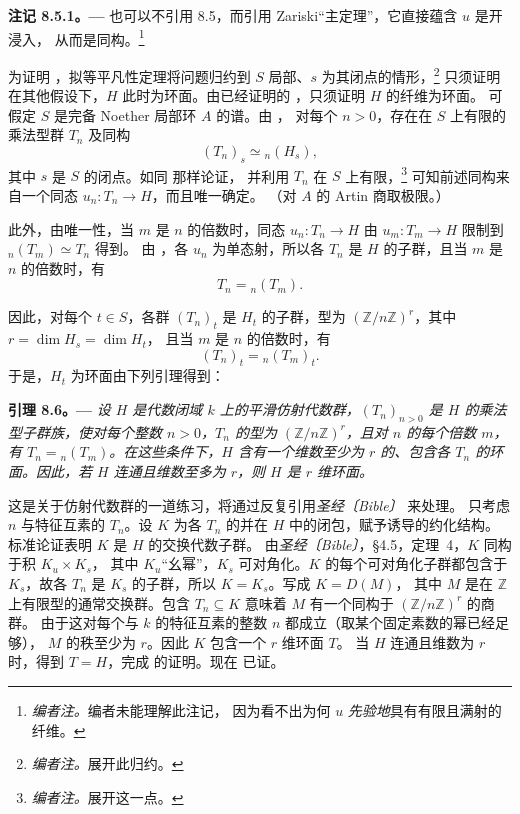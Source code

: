 \par\medskip\noindent{}\textbf{注记 8.5.1。---}\enspace
也可以不引用 8.5，而引用 Zariski“主定理”，它直接蕴含 \(u\) 是开浸入，
从而是同构。\footnote{\textit{编者注。}编者未能理解此注记，
因为看不出为何 \(u\) \emph{先验地}具有有限且满射的纤维。}

为证明 ，拟等平凡性定理将问题归约到
\(S\) 局部、\(s\) 为其闭点的情形，\footnote{\textit{编者注。}展开此归约。}
只须证明在其他假设下，\(H\) 此时为环面。由已经证明的
，只须证明 \(H\) 的纤维为环面。
可假定 \(S\) 是完备 Noether 局部环 \(A\) 的谱。由 ，
对每个 \(n>0\)，存在在 \(S\) 上有限的乘法型群 \(T_n\) 及同构
\[
  (T_n)_s\simeq {}_n(H_s),
\]
其中 \(s\) 是 \(S\) 的闭点。如同  那样论证，
并利用 \(T_n\) 在 \(S\) 上有限，\footnote{\textit{编者注。}展开这一点。}
可知前述同构来自一个同态 \(u_n:T_n\to H\)，而且唯一确定。
（对 \(A\) 的 Artin 商取极限。）

此外，由唯一性，当 \(m\) 是 \(n\) 的倍数时，同态 \(u_n:T_n\to H\)
由 \(u_m:T_m\to H\) 限制到 \({}_n(T_m)\simeq T_n\) 得到。
由 ，各 \(u_n\) 为单态射，所以各 \(T_n\)
是 \(H\) 的子群，且当 \(m\) 是 \(n\) 的倍数时，有
\[
  T_n={}_n(T_m).
\]

因此，对每个 \(t\in S\)，各群 \((T_n)_t\) 是 \(H_t\) 的子群，型为
\((\mathbb{Z}/n\mathbb{Z})^r\)，其中 \(r=\dim H_s=\dim H_t\)，
且当 \(m\) 是 \(n\) 的倍数时，有
\[
  (T_n)_t={}_n(T_m)_t.
\]
于是，\(H_t\) 为环面由下列引理得到：

\par\medskip\noindent{}\textbf{引理 8.6。---}\enspace
\emph{设 \(H\) 是代数闭域 \(k\) 上的平滑仿射代数群，\((T_n)_{n>0}\)
是 \(H\) 的乘法型子群族，使对每个整数 \(n>0\)，\(T_n\) 的型为
\((\mathbb{Z}/n\mathbb{Z})^r\)，且对 \(n\) 的每个倍数 \(m\)，有
\(T_n={}_n(T_m)\)。在这些条件下，\(H\) 含有一个维数至少为 \(r\) 的、包含各 \(T_n\)
的环面。因此，若 \(H\) 连通且维数至多为 \(r\)，则 \(H\) 是 \(r\) 维环面。}

这是关于仿射代数群的一道练习，将通过反复引用\emph{圣经〔Bible〕} 来处理。
只考虑 \(n\) 与特征互素的 \(T_n\)。设 \(K\) 为各 \(T_n\) 的并在 \(H\)
中的闭包，赋予诱导的约化结构。标准论证表明 \(K\) 是 \(H\) 的交换代数子群。
由\emph{圣经〔Bible〕}，\S4.5，定理~4，\(K\) 同构于积 \(K_u\times K_s\)，
其中 \(K_u\)“幺幂”，\(K_s\) 可对角化。\(K\) 的每个可对角化子群都包含于
\(K_s\)，故各 \(T_n\) 是 \(K_s\) 的子群，所以 \(K=K_s\)。写成 \(K=D(M)\)，
其中 \(M\) 是在 \(\mathbb{Z}\) 上有限型的通常交换群。包含 \(T_n\subseteq K\)
意味着 \(M\) 有一个同构于 \((\mathbb{Z}/n\mathbb{Z})^r\) 的商群。
由于这对每个与 \(k\) 的特征互素的整数 \(n\) 都成立（取某个固定素数的幂已经足够），
\(M\) 的秩至少为 \(r\)。因此 \(K\) 包含一个 \(r\) 维环面 \(T\)。
当 \(H\) 连通且维数为 \(r\) 时，得到 \(T=H\)，完成
 的证明。现在 已证。

